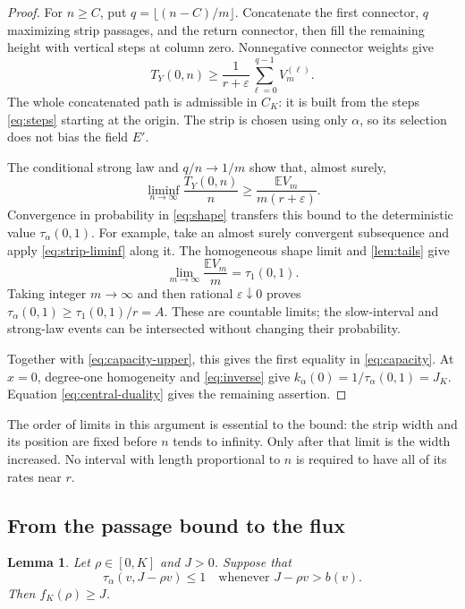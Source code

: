 \documentclass[11pt]{amsart}
\newtheorem{lemma}[theorem]{Lemma}
\theoremstyle{remark}
\newcommand{\EE}{\mathbb E}
\numberwithin{equation}{section}
\begin{document}
\begin{proof}
For $n\geq C$, put $q=\lfloor(n-C)/m\rfloor$. Concatenate the first
connector, $q$ maximizing strip passages, and the return connector,
then fill the remaining height with vertical steps at column zero.
Nonnegative connector weights give
\begin{equation}\label{eq:strip-sum}
 T_Y(0,n)\geq\frac1{r+\varepsilon}
                    \sum_{\ell=0}^{q-1}V_m^{(\ell)}.
\end{equation}
The whole concatenated path is admissible in $C_K$: it is built from
the steps \eqref{eq:steps} starting at the origin. The strip is
chosen using only $\alpha$, so its selection does not bias the field
$E'$.

The conditional strong law and $q/n\to1/m$ show that, almost surely,
\begin{equation}\label{eq:strip-liminf}
 \liminf_{n\to\infty}\frac{T_Y(0,n)}n
       \geq\frac{\EE V_m}{m(r+\varepsilon)}.
\end{equation}
Convergence in probability in \eqref{eq:shape} transfers this bound to
the deterministic value $\tau_\alpha(0,1)$. For example, take an
almost surely convergent subsequence and apply
\eqref{eq:strip-liminf} along it. The homogeneous shape limit and
\cref{lem:tails} give
\[
 \lim_{m\to\infty}\frac{\EE V_m}m=\tau_1(0,1).
\]
Taking integer $m\to\infty$ and then rational
$\varepsilon\downarrow0$ proves
$\tau_\alpha(0,1)\geq\tau_1(0,1)/r=A$.
These are countable limits; the slow-interval and strong-law events
can be intersected without changing their probability.

Together with \eqref{eq:capacity-upper}, this gives the first equality
in \eqref{eq:capacity}. At $x=0$, degree-one homogeneity and
\eqref{eq:inverse} give $k_\alpha(0)=1/\tau_\alpha(0,1)=J_K$.
Equation \eqref{eq:central-duality} gives the remaining assertion.
\end{proof}

The order of limits in this argument is essential to the bound: the
strip width and its position are fixed before $n$ tends to infinity.
Only after that limit is the width increased. No interval with length
proportional to $n$ is required to have all of its rates near $r$.

\subsection{From the passage bound to the flux}

\begin{lemma}\label{lem:line}
Let $\rho\in[0,K]$ and $J>0$. Suppose that
\[
 \tau_\alpha(v,J-\rho v)\leq1
 \quad\text{whenever }J-\rho v>b(v).
\]
Then $f_K(\rho)\geq J$.
\end{lemma}
\end{document}
